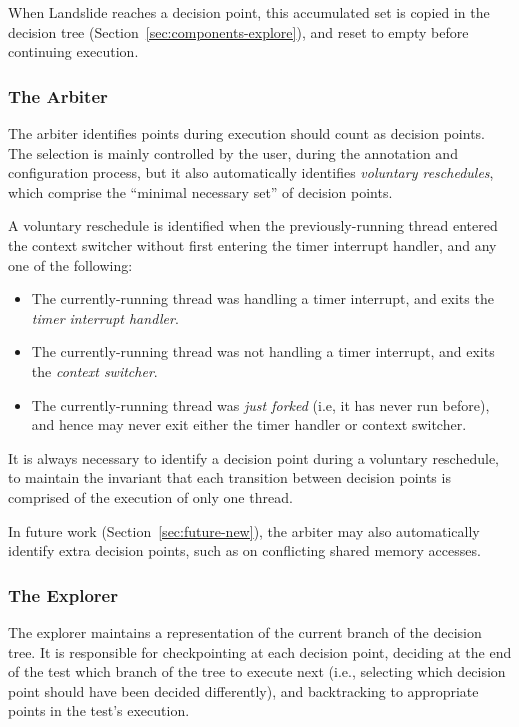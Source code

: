 When Landslide reaches a decision point, this accumulated set is copied in the decision tree (Section~\ref{sec:components-explore}), and reset to empty before continuing execution.

\subsubsection{The Arbiter}

The arbiter identifies points during execution should count as decision points. The selection is mainly controlled by the user, during the annotation and configuration process, but it also automatically identifies {\em voluntary reschedules}, which comprise the ``minimal necessary set'' of decision points.

A voluntary reschedule is identified when the previously-running thread entered the context switcher without first entering the timer interrupt handler, and any one of the following:
\begin{itemize}
	\item The currently-running thread was handling a timer interrupt, and exits the {\em timer interrupt handler}.
	\item The currently-running thread was not handling a timer interrupt, and exits the {\em context switcher}.
	\item The currently-running thread was {\em just forked} (i.e, it has never run before), and hence may never exit either the timer handler or context switcher.
\end{itemize}

It is always necessary to identify a decision point during a voluntary reschedule, to maintain the invariant that each transition between decision points is comprised of the execution of only one thread.

In future work (Section~\ref{sec:future-new}), the arbiter may also automatically identify extra decision points, such as on conflicting shared memory accesses.

\subsubsection{The Explorer}

The explorer maintains a representation of the current branch of the decision tree. It is responsible for checkpointing at each decision point, deciding at the end of the test which branch of the tree to execute next (i.e., selecting which decision point should have been decided differently), and backtracking to appropriate points in the test's execution.

